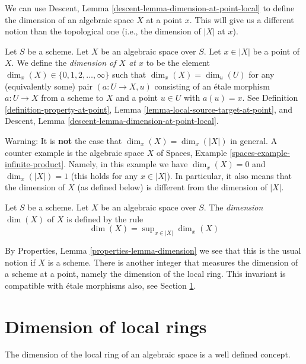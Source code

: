 \noindent
We can use
Descent, Lemma \ref{descent-lemma-dimension-at-point-local}
to define the dimension of an algebraic
space $X$ at a point $x$. This will give us a different notion than the
topological one (i.e., the dimension of $|X|$ at $x$).

\begin{definition}
\label{definition-dimension-at-point}
Let $S$ be a scheme.
Let $X$ be an algebraic space over $S$.
Let $x \in |X|$ be a point of $X$.
We define the {\it dimension of $X$ at $x$} to be
the element $\dim_x(X) \in \{0, 1, 2, \ldots, \infty\}$
such that $\dim_x(X) = \dim_u(U)$ for any (equivalently some)
pair $(a : U \to X, u)$ consisting of an \'etale morphism $a : U \to X$
from a scheme to $X$ and a point $u \in U$ with $a(u) = x$.
See
Definition \ref{definition-property-at-point},
Lemma \ref{lemma-local-source-target-at-point}, and
Descent, Lemma \ref{descent-lemma-dimension-at-point-local}.
\end{definition}

\noindent
Warning: It is {\bf not} the case that $\dim_x(X) = \dim_x(|X|)$
in general. A counter example is the algebraic space $X$ of
Spaces, Example \ref{spaces-example-infinite-product}.
Namely, in this example we have $\dim_x(X) = 0$ and
$\dim_x(|X|) = 1$ (this holds for any $x \in |X|$).
In particular, it also means that the dimension of $X$ (as defined
below) is different from the dimension of $|X|$.

\begin{definition}
\label{definition-dimension}
Let $S$ be a scheme. Let $X$ be an algebraic space over $S$.
The {\it dimension} $\dim(X)$ of $X$ is defined by the rule
$$
\dim(X) = \sup\nolimits_{x \in |X|} \dim_x(X)
$$
\end{definition}

\noindent
By
Properties, Lemma \ref{properties-lemma-dimension}
we see that this is the usual notion if $X$ is a scheme.
There is another integer that measures the dimension of a scheme
at a point, namely the dimension of the local ring. This invariant
is compatible with \'etale morphisms also, see
Section \ref{section-dimension-local-ring}.






\section{Dimension of local rings}
\label{section-dimension-local-ring}

\noindent
The dimension of the local ring of an algebraic space is a well defined
concept.

